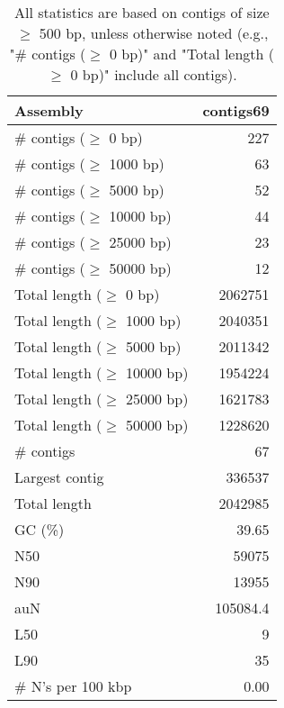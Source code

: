 \documentclass[12pt,a4paper]{article}
\begin{document}
\begin{table}[ht]
\begin{center}
\caption{All statistics are based on contigs of size $\geq$ 500 bp, unless otherwise noted (e.g., "\# contigs ($\geq$ 0 bp)" and "Total length ($\geq$ 0 bp)" include all contigs).}
\begin{tabular}{|l*{1}{|r}|}
\hline
Assembly & contigs69 \\ \hline
\# contigs ($\geq$ 0 bp) & 227 \\ \hline
\# contigs ($\geq$ 1000 bp) & 63 \\ \hline
\# contigs ($\geq$ 5000 bp) & 52 \\ \hline
\# contigs ($\geq$ 10000 bp) & 44 \\ \hline
\# contigs ($\geq$ 25000 bp) & 23 \\ \hline
\# contigs ($\geq$ 50000 bp) & 12 \\ \hline
Total length ($\geq$ 0 bp) & 2062751 \\ \hline
Total length ($\geq$ 1000 bp) & 2040351 \\ \hline
Total length ($\geq$ 5000 bp) & 2011342 \\ \hline
Total length ($\geq$ 10000 bp) & 1954224 \\ \hline
Total length ($\geq$ 25000 bp) & 1621783 \\ \hline
Total length ($\geq$ 50000 bp) & 1228620 \\ \hline
\# contigs & 67 \\ \hline
Largest contig & 336537 \\ \hline
Total length & 2042985 \\ \hline
GC (\%) & 39.65 \\ \hline
N50 & 59075 \\ \hline
N90 & 13955 \\ \hline
auN & 105084.4 \\ \hline
L50 & 9 \\ \hline
L90 & 35 \\ \hline
\# N's per 100 kbp & 0.00 \\ \hline
\end{tabular}
\end{center}
\end{table}
\end{document}
